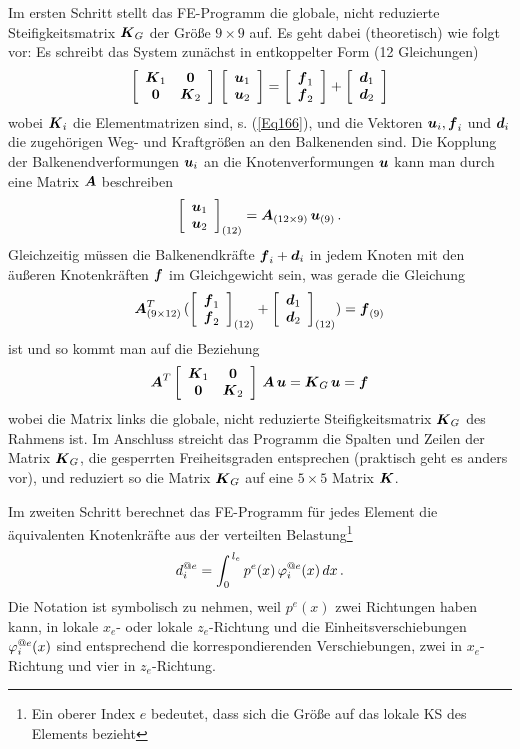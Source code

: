 Im ersten Schritt stellt das FE-Programm die globale, nicht reduzierte Steifigkeitsmatrix $ \vek K_G$ der Gr\"{o}{\ss}e $9 \times 9$ auf. Es geht dabei (theoretisch) wie folgt vor:  Es schreibt das System zun\"{a}chst in entkoppelter Form (12 Gleichungen)
\begin{align}
\left[ \barr{c c} \vek K_1 & \vek 0 \\ \vek  0 & \vek K_2 \earr \right] \,\left[ \barr{c}\vek u_1 \\ \vek u_2 \earr \right] =\left[ \barr{c} \vek f_1 \\ \vek f_2\earr \right] + \left[ \barr{c} \vek d_1\\ \vek d_2\earr \right]
\end{align}
wobei $\vek K_i$ die Elementmatrizen sind, s. (\ref{Eq166}), und die Vektoren $\vek u_i, \vek f_i$ und $\vek d_i$ die zugeh\"{o}rigen Weg- und Kraftgr\"{o}{\ss}en an den Balkenenden sind. Die Kopplung der Balkenendverformungen $\vek u_i$ an die Knotenverformungen $\vek u$ kann man durch eine Matrix $\vek A$ beschreiben
\begin{align}
 \left[ \barr{c}\vek u_1 \\ \vek u_2 \earr \right]_{(12)} = \vek A_{(12 \times 9)}\,\vek u_{(9)}\,.
\end{align}
Gleichzeitig m\"{u}ssen die Balkenendkr\"{a}fte $\vek f_i + \vek d_i$ in jedem Knoten mit den \"{a}u{\ss}eren Knotenkr\"{a}ften $\vek f$ im Gleichgewicht sein, was gerade die Gleichung
\begin{align}
\vek A^T_{(9 \times 12)}\,(\left[ \barr{c} \vek f_1 \\ \vek f_2\earr \right]_{(12)} + \left[ \barr{c} \vek d_1\\ \vek d_2\earr \right]_{(12)}) = \vek f_{(9)}
\end{align}
ist und so kommt man auf die Beziehung
\begin{align}
\vek A^T \left[ \barr{c c} \vek K_1 & \vek 0 \\ \vek  0 & \vek K_2 \earr \right]\,\vek A\,\vek u = \vek K_G\,\vek u = \vek f
\end{align}
wobei die Matrix links die globale, nicht reduzierte Steifigkeitsmatrix $\vek K_G$ des Rahmens ist. Im Anschluss streicht das Programm die Spalten und Zeilen der Matrix $ \vek K_G$, die gesperrten Freiheitsgraden entsprechen (praktisch geht es anders vor), und reduziert so die Matrix $\vek K_G$ auf eine $5 \times 5$ Matrix $\vek K$.

Im zweiten Schritt berechnet das FE-Programm f\"{u}r jedes Element die \"{a}quivalenten Knotenkr\"{a}fte aus der verteilten Belastung\footnote{Ein oberer Index $e$ bedeutet, dass sich die Gr\"{o}{\ss}e auf das lokale KS des Elements bezieht}
\begin{align}
d_{i}^{@e} = \int_0^{\,l_e} p^e(x)\,\Np_i^{@e}(x)\,dx\,.
\end{align}
Die Notation ist symbolisch zu nehmen, weil $p^e(x)$ zwei Richtungen haben kann, in lokale $x_e$- oder lokale $z_e$-Richtung und die Einheitsverschiebungen $\Np_i^{@e}(x)$ sind entsprechend die korrespondierenden Verschiebungen, zwei in $x_e$-Richtung und vier in $z_e$-Richtung.

